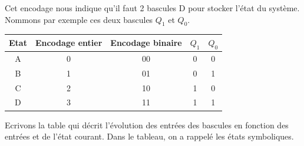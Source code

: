 \documentclass[a4paper,11pt]{article}
\newif\ifsolutions
\begin{document}
\ifsolutions
\begin{solbox}
Cet encodage nous indique qu'il faut 2 bascules D pour stocker l'état du système. Nommons par exemple ces deux bascules $Q_1$ et $Q_0$.


  \begin{center}
        \begin{tabular}{|c||c|c|cc|}
            \hline
            Etat  & Encodage entier & Encodage binaire & $Q_1$ & $Q_0$ \\ \hline \hline
            A     & 0 & 00 & 0 & 0 \\ \hline
            B     & 1 & 01 & 0 & 1 \\ \hline
            C     & 2 & 10 & 1 & 0 \\ \hline
            D     & 3 & 11 & 1 & 1 \\ \hline
        \end{tabular}
  \end{center}


Ecrivons la table qui décrit l'évolution des entrées des bascules en fonction des entrées et de l'état courant. Dans le tableau, on a rappelé les états symboliques.



\end{solbox}
\end{document}
